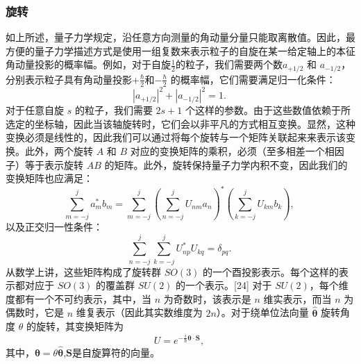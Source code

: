 \subsubsection{旋转}  
如上所述，量子力学规定，沿任意方向测量的角动量分量只能取离散值。因此，最方便的量子力学描述方式是使用一组复数来表示粒子的自旋在某一给定轴上的本征角动量投影的概率幅。例如，对于自旋\( \frac{1}{2} \)的粒子，我们需要两个数\( a_{+1/2} \) 和 \( a_{-1/2}\)，分别表示粒子具有角动量投影\( +\frac{\hbar}{2} \)和\( -\frac{\hbar}{2}\) 的概率幅，它们需要满足归一化条件：  
\[
|a_{+1/2}|^{2} + |a_{-1/2}|^{2} = 1.~
\]
对于任意自旋 \( s \) 的粒子，我们需要 \( 2s + 1 \) 个这样的参数。由于这些数值依赖于所选定的坐标轴，因此当该轴旋转时，它们会以非平凡的方式相互变换。显然，这种变换必须是线性的，因此我们可以通过将每个旋转与一个矩阵关联起来来表示该变换。此外，两个旋转 \( A \) 和 \( B \) 对应的变换矩阵的乘积，必须（至多相差一个相因子）等于表示旋转 \( AB \) 的矩阵。此外，旋转保持量子力学内积不变，因此我们的变换矩阵也应满足：  
\[
\sum _{m=-j}^{j} a_m^{*} b_m = \sum _{m=-j}^{j} \left( \sum _{n=-j}^{j} U_{nm} a_n \right)^{*} \left( \sum _{k=-j}^{j} U_{km} b_k \right),~
\]
以及正交归一性条件：  
\[
\sum _{n=-j}^{j} \sum _{k=-j}^{j} U_{np}^{*} U_{kq} = \delta _{pq}.~
\]
从数学上讲，这些矩阵构成了旋转群 \( SO(3) \) 的一个酉投影表示。每个这样的表示都对应于 \( SO(3) \) 的覆盖群 \( SU(2) \) 的一个表示。[24] 对于 \( SU(2) \)，每个维度都有一个不可约表示，其中，当 \( n \) 为奇数时，该表示是 \( n \) 维实表示，而当 \( n \) 为偶数时，它是 \( n \) 维复表示（因此其实数维度为 \( 2n \)）。对于绕单位法向量 \( \hat{\boldsymbol{\theta}} \) 旋转角度 \( \theta \) 的旋转，其变换矩阵为  
\[
U = e^{-\frac{i}{\hbar} \boldsymbol{\theta} \cdot \mathbf{S}},~
\]
其中，\(\boldsymbol{\theta} = \theta \hat{\boldsymbol{\theta}}\),\( \mathbf{S}\)是自旋算符的向量。
